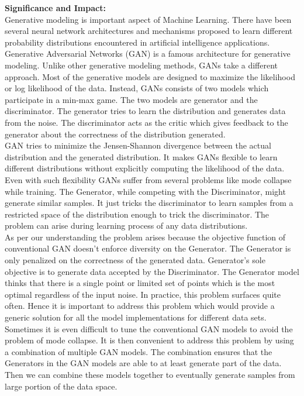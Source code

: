 \documentclass[12pt]{article}
\begin{document}
\noindent \textbf{Significance and Impact:}\\

Generative modeling is important aspect of Machine Learning. There have been several neural network architectures and mechanisms proposed to learn different probability distributions encountered in artificial intelligence applications. Generative Adversarial Networks (GAN) is a famous architecture for generative modeling. Unlike other generative modeling methods, GANs take a different approach. Most of the generative models are designed to maximize the likelihood or log likelihood of the data. Instead, GANs consists of two models which participate in a min-max game. The two models are generator and the discriminator. The generator tries to learn the distribution and generates data from the noise. The discriminator acts as the critic which gives feedback to the generator about the correctness of the distribution generated.\\

GAN tries to minimize the Jensen-Shannon divergence between the actual distribution and the generated distribution. It makes GANs flexible to learn different distributions without explicitly computing the likelihood of the data. Even with such flexibility GANs suffer from several problems like mode collapse while training. The Generator, while competing with the Discriminator, might generate similar samples. It just tricks the discriminator to learn samples from a restricted space of the distribution enough to trick the discriminator. The problem can arise during learning process of any data distributions.\\

As per our understanding the problem arises because the objective function of conventional GAN doesn't enforce diversity on the Generator. The Generator is only penalized on the correctness of the generated data. Generator's sole objective is to generate data accepted by the Discriminator. The Generator model thinks that there is a single point or limited set of points which is the most optimal regardless of the input noise. In practice, this problem surfaces quite often. Hence it is important to address this problem which would provide a generic solution for all the model implementations for different data sets. Sometimes it is even difficult to tune the conventional GAN models to avoid the problem of mode collapse. It is then convenient to address this problem by using a combination of multiple GAN models. The combination ensures that the Generators in the GAN models are able to at least generate part of the data. Then we can combine these models together to eventually generate samples from large portion of the data space.\\
\end{document}
